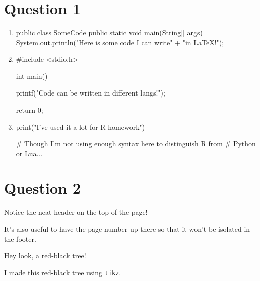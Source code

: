 \documentclass[11pt]{report}
\title{\textbf{\HomeworkTitle}}
\author{\HomeworkAuthor}
\date{\HomeworkDate}
\newcommand{\TextColor}{black}
\newcommand{\TextColor}{white}
\newcommand{\TextColor}{black}
\begin{document}
\maketitle

\section{Question 1}
\begin{enumerate}[label = \alph*.]
	\item \begin{javacode}
			public class SomeCode {
				public static void main(String[] args) {
					System.out.println("Here is some code I can write" +
						"in LaTeX!");
				}
			}
	      \end{javacode}

	\item \begin{ccode}
			#include <stdio.h>

			int main() {
				printf("Code can be written in different langs!");

				return 0;
			}
	      \end{ccode}

	\item \begin{rcode}
		      print("I've used it a lot for R homework")

		      # Though I'm not using enough syntax here to distinguish R from
		      # Python or Lua...
	      \end{rcode}
\end{enumerate}

\newpage

\section{Question 2}

Notice the neat header on the top of the page!

It's also useful to have the page number up there so that it won't be isolated in the footer.

Hey look, a red-black tree!

\begin{center}

	I made this red-black tree using \Verb|tikz|.
\end{center}
\end{document}
